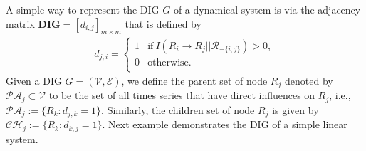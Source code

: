 A simple way to represent the DIG $G$ of a dynamical system is via the adjacency matrix $\textbf{DIG}=[d_{i,j}]_{m\times m}$ that is defined by
\begin{align}
    d_{j,i} = \left\{
\begin{array}{ll}
      1 & \text{if}\  I(R_i\rightarrow R_j||\mathcal{R}_{-\{i,j\}})>0,\\
      0 & \text{otherwise}. \\
\end{array} 
\right. 
\end{align}
Given a DIG $G=(\mathcal{V},\mathcal{E})$, we define the parent set of node $R_j$ denoted by $\mathcal{PA}_j\subset \mathcal{V}$ to be the set of all times series that have direct influences on $R_j$, i.e., $\mathcal{PA}_j:=\{R_k: d_{j,k}=1\}$. Similarly, the children set of node $R_j$ is given by $\mathcal{CH}_j:=\{R_k: d_{k,j}=1\}$. 
Next example demonstrates the DIG of a simple linear system.
